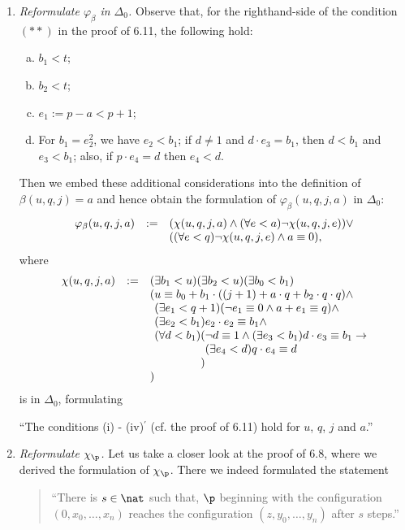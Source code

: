 \begin{enumerate}[(1)]
\item \emph{Reformulate $\varphi_\beta$ in $\Delta_0$.} Observe that, for the righthand-side of the condition $(**)$ in the proof of 6.11, the following hold:
\begin{enumerate}[(a)]
\item $b_1 < t$;
\item $b_2 < t$;
\item $e_1 := p - a < p + 1$;
\item For $b_1 = e_2^2$, we have $e_2 < b_1$; if $d \neq 1$ and $d \cdot e_3 = b_1$, then $d < b_1$ and $e_3 < b_1$; also, if $p \cdot e_4 = d$ then $e_4 < d$.
\end{enumerate}
Then we embed these additional considerations into the definition of $\beta(u, q, j) = a$ and hence obtain the formulation of $\varphi_\beta(u, q, j, a)$ in $\Delta_0$:
\[
\begin{array}{lll}
\varphi_\beta (u, q, j, a) & := & (\chi (u, q, j, a) \land (\forall e < a) \neg\chi (u, q, j, e)) \lor \cr
\ & \ & ((\forall e < q) \neg\chi (u, q, j, e) \land a \equiv 0),
\end{array}
\]
where
\[
\begin{array}{lll}
\chi (u, q, j, a) & := & (\exists b_1 < u)(\exists b_2 < u)(\exists b_0 < b_1) \cr
\ & \ & (u \equiv b_0 + b_1 \cdot ((j + 1) + a \cdot q + b_2 \cdot q \cdot q) \land \cr
\ & \ & \phantom{(}(\exists e_1 < q + 1)(\neg e_1 \equiv 0 \land a + e_1 \equiv q) \land \cr
\ & \ & \phantom{)}(\exists e_2 < b_1)e_2 \cdot e_2 \equiv b_1 \land \cr
\ & \ & \phantom{(}(\forall d < b_1)(\neg d \equiv 1 \land (\exists e_3 < b_1) d \cdot e_3 \equiv b_1 \rightarrow \cr
\ & \ & \phantom{(\forall d < b_1)()}(\exists e_4 < d) q \cdot e_4 \equiv d \cr
\ & \ & \phantom{(\forall d < b_1))}) \cr
\ & \ & )
\end{array}
\]
is in $\Delta_0$, formulating
\begin{center}
``The conditions (i) - (iv)$^\prime$ (cf. the proof of 6.11) hold for $u$, $q$, $j$ and $a$.''
\end{center}
\item \emph{Reformulate $\chi_\p$.} Let us take a closer look at the proof of 6.8, where we derived the formulation of $\chi_\p$. There we indeed formulated the statement
\begin{quote}
``There is $s \in \nat$ such that, $\p$ beginning with the configuration $(0, x_0, \ldots, x_n)$ reaches the configuration $(z, y_0, \ldots, y_n)$ after $s$ steps.''

\end{quote}
\end{enumerate}
